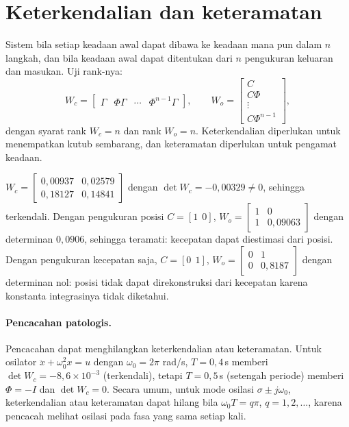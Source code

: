 \section{Keterkendalian dan keteramatan}
Sistem  bila setiap keadaan awal dapat dibawa ke keadaan mana pun dalam $n$ langkah, dan  bila keadaan awal dapat ditentukan dari $n$ pengukuran keluaran dan masukan. Uji rank-nya:
\begin{equation}
	W_c = \begin{bmatrix}\Gamma & \Phi\Gamma & \cdots & \Phi^{n-1}\Gamma\end{bmatrix},\qquad
	W_o = \begin{bmatrix}C\\ C\Phi\\ \vdots\\ C\Phi^{n-1}\end{bmatrix},
\end{equation}
dengan syarat rank $W_c = n$ dan rank $W_o = n$. Keterkendalian diperlukan untuk menempatkan kutub sembarang, dan keteramatan diperlukan untuk pengamat keadaan.

\begin{contoh}
	$W_c = \begin{bmatrix}0{,}00937 & 0{,}02579\\ 0{,}18127 & 0{,}14841\end{bmatrix}$ dengan $\det W_c = -0{,}00329 \ne 0$, sehingga terkendali. Dengan pengukuran posisi $C = [1\ \ 0]$, $W_o = \begin{bmatrix}1 & 0\\ 1 & 0{,}09063\end{bmatrix}$ dengan determinan $0{,}0906$, sehingga teramati: kecepatan dapat diestimasi dari posisi. Dengan pengukuran kecepatan saja, $C = [0\ \ 1]$, $W_o = \begin{bmatrix}0 & 1\\ 0 & 0{,}8187\end{bmatrix}$ dengan determinan nol: posisi tidak dapat direkonstruksi dari kecepatan karena konstanta integrasinya tidak diketahui.
\end{contoh}

\paragraph{Pencacahan patologis.} Pencacahan dapat menghilangkan keterkendalian atau keteramatan. Untuk osilator $\ddot x + \omega_0^2x = u$ dengan $\omega_0 = 2\pi$ rad/s, $T = 0{,}4$\,s memberi $\det W_c = -8{,}6\times10^{-3}$ (terkendali), tetapi $T = 0{,}5$\,s (setengah periode) memberi $\Phi = -I$ dan $\det W_c = 0$. Secara umum, untuk mode osilasi $\sigma \pm j\omega_0$, keterkendalian atau keteramatan dapat hilang bila $\omega_0T = q\pi$, $q = 1, 2, \dots$, karena pencacah melihat osilasi pada fasa yang sama setiap kali.


